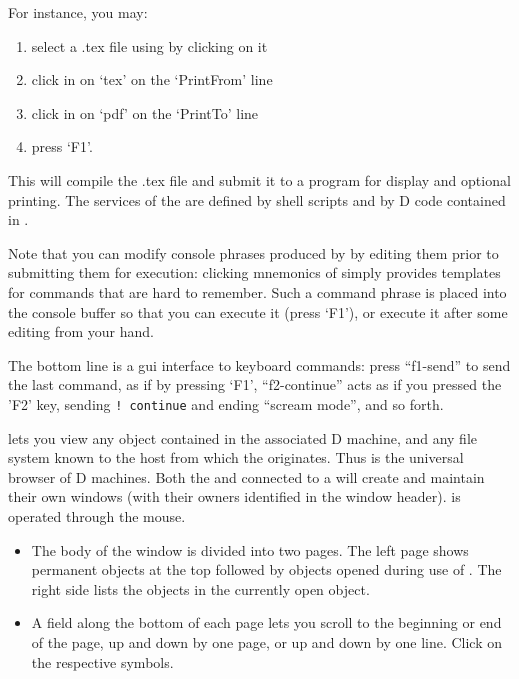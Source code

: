 \begin{description}
  \begin{nopb}
  For instance, you may: 
  \begin{enumerate}
  \item select a .tex file using  by clicking on it
  \item click in  on `tex' on the `PrintFrom' line
  \item click in  on `pdf' on the `PrintTo' line
  \item press `F1'.
  \end{enumerate}
  This will compile the .tex file and submit it to a program for
  display and optional printing. The services of the 
  are defined by shell scripts and by D code contained in
  .
  \end{nopb}

  Note that you can modify console phrases
  produced by  by editing them prior to submitting
  them for execution: clicking mnemonics of  simply
  provides templates for commands that are hard to remember. Such a
  command phrase is placed into the console buffer so that you can
  execute it (press `F1'), or execute it after some editing from your
  hand.

  The bottom line is a gui interface to keyboard commands: press
  ``f1-send'' to send the last command, as if by pressing `F1',
  ``f2-continue'' acts as if you pressed the 'F2' key, sending
  \texttt{!}~\texttt{continue} and ending ``scream mode'', and so forth.

\item[\win{TheEye}] lets you view any object contained in the
  associated D machine, and any file system known to the host from
  which the  originates. Thus  is the
  universal browser of D machines. Both the  and
   connected to a  will create and
  maintain their own  windows (with their owners
  identified in the window header).  is operated through
  the mouse.

  \begin{itemize}
  \item The body of the window is divided into two pages. The left
    page shows permanent objects at the top followed by objects opened
    during use of . The right side lists the objects in
    the currently open object.

  \item A field along the bottom of each page lets you scroll to the
    beginning or end of the page, up and down by one page, or up and
    down by one line. Click on the respective symbols.


\end{itemize}
\end{description}
